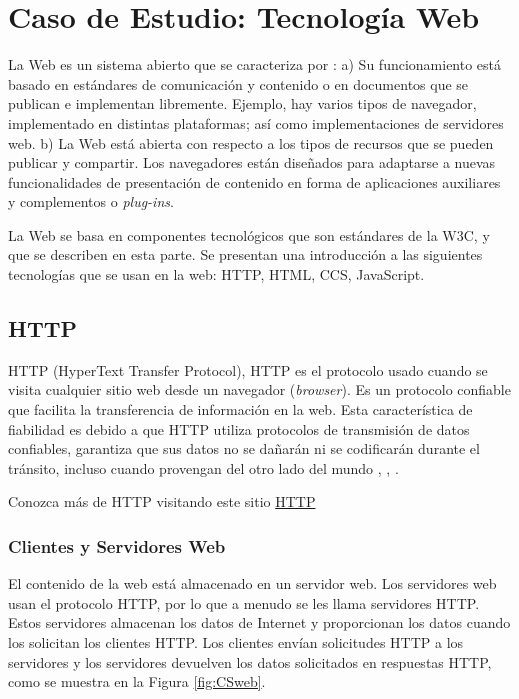 \section{Caso de Estudio: Tecnología Web}
\label{sec:caso-estudio:web}

La Web es un sistema abierto que se  caracteriza por \cite{Coulouris2011}: a) Su funcionamiento está basado en estándares de comunicación y contenido o en documentos que se publican e implementan libremente. Ejemplo, hay varios tipos de navegador,  implementado en distintas plataformas; así como  implementaciones de servidores web. b) La Web está abierta con respecto a los tipos de \gls{recursos} que se pueden publicar y compartir. Los navegadores están diseñados para adaptarse a nuevas funcionalidades de presentación de contenido en forma de aplicaciones auxiliares y complementos o \textit{plug-ins}.

La Web se basa en  componentes tecnológicos que son  estándares de la W3C, \cite{W3C2022} y que se describen en esta parte. Se presentan una introducción a las siguientes tecnolog\'ias que se usan  en la web: HTTP, HTML, CCS, JavaScript.

\subsection{HTTP}    
HTTP (HyperText Transfer Protocol), \gls{HTTP} es el protocolo usado cuando se visita cualquier sitio web desde un navegador (\textit{browser}). Es un protocolo confiable que facilita la transferencia de información en la web. Esta característica de fiabilidad es  debido a que HTTP utiliza protocolos de transmisión de datos confiables, garantiza que sus datos no se dañarán ni se codificarán durante el tránsito, incluso cuando provengan del otro lado del mundo \cite{W3C2022}, \cite{Gourley2002},  \cite{Allen2017}.

 
\begin{tcolorbox}
	[colback=red!5!white,colframe=red!75!black,fonttitle=\bfseries,title=HTTP]
	Conozca m\'as de HTTP visitando este sitio  \href{https://www.w3.org/Protocols/}{HTTP}
\end{tcolorbox}

	\subsubsection{Clientes y Servidores Web}      
	El contenido de la  web está almacenado en un \gls{servidor web}. Los servidores web usan el protocolo HTTP, por lo que a menudo se les llama servidores HTTP. Estos servidores almacenan los datos de Internet y proporcionan los datos cuando los solicitan los clientes HTTP. Los clientes envían solicitudes HTTP a los servidores y los servidores devuelven los datos solicitados en respuestas HTTP, como se muestra en la Figura \ref{fig:CSweb}. 
	
